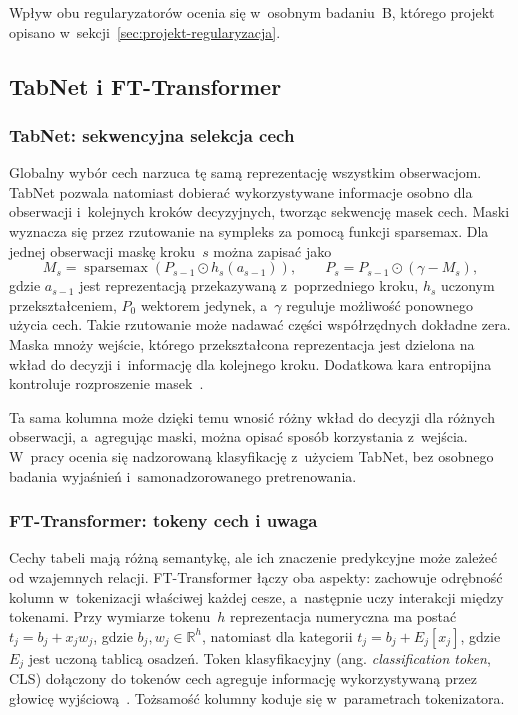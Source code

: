 Wpływ obu regularyzatorów ocenia się w~osobnym badaniu~B, którego projekt opisano w~sekcji~\ref{sec:projekt-regularyzacja}.

\subsection{TabNet i FT-Transformer}
\label{sec:tabnet-ft}

\subsubsection{TabNet: sekwencyjna selekcja cech}
\label{sec:tabnet}

Globalny wybór cech narzuca tę samą reprezentację wszystkim obserwacjom. TabNet pozwala natomiast dobierać wykorzystywane informacje osobno dla obserwacji i~kolejnych kroków decyzyjnych, tworząc sekwencję masek cech. Maski wyznacza się przez rzutowanie na sympleks za pomocą funkcji sparsemax. Dla jednej obserwacji maskę kroku~$s$ można zapisać jako
\begin{equation}
M_s=\operatorname{sparsemax}\!\left(P_{s-1}\odot h_s(a_{s-1})\right),
\qquad P_s=P_{s-1}\odot(\gamma-M_s),
\label{eq:tabnet-maska}
\end{equation}
gdzie $a_{s-1}$ jest reprezentacją przekazywaną z~poprzedniego kroku, $h_s$ uczonym przekształceniem, $P_0$ wektorem jedynek, a~$\gamma$ reguluje możliwość ponownego użycia cech. Takie rzutowanie może nadawać części współrzędnych dokładne zera. Maska mnoży wejście, którego przekształcona reprezentacja jest dzielona na wkład do decyzji i~informację dla kolejnego kroku. Dodatkowa kara entropijna kontroluje rozproszenie masek~\cite{arik2021tabnet}.

Ta sama kolumna może dzięki temu wnosić różny wkład do decyzji dla różnych obserwacji, a~agregując maski, można opisać sposób korzystania z~wejścia. W~pracy ocenia się nadzorowaną klasyfikację z~użyciem TabNet, bez osobnego badania wyjaśnień i~samonadzorowanego pretrenowania.

\subsubsection{FT-Transformer: tokeny cech i uwaga}
\label{sec:ft-transformer}

Cechy tabeli mają różną semantykę, ale ich znaczenie predykcyjne może zależeć od wzajemnych relacji. FT-Transformer łączy oba aspekty: zachowuje odrębność kolumn w~tokenizacji właściwej każdej cesze, a~następnie uczy interakcji między tokenami. Przy wymiarze tokenu~$h$ reprezentacja numeryczna ma postać $t_j=b_j+x_jw_j$, gdzie $b_j,w_j\in\mathbb{R}^{h}$, natomiast dla kategorii $t_j=b_j+E_j[x_j]$, gdzie $E_j$ jest uczoną tablicą osadzeń. Token klasyfikacyjny (ang. \textit{classification token}, CLS) dołączony do tokenów cech agreguje informację wykorzystywaną przez głowicę wyjściową~\cite{gorishniy2021revisiting}. Tożsamość kolumny koduje się w~parametrach tokenizatora.

